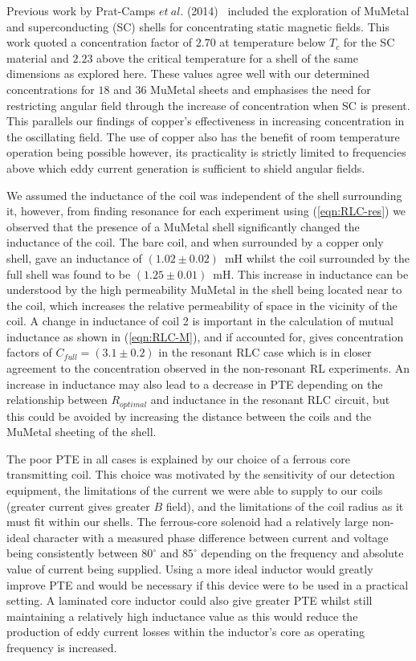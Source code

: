 \documentclass[11pt]{iopart}
\begin{document}
Previous work by Prat-Camps $et~al.$ (2014)~\cite{N2014} included the exploration of
MuMetal and superconducting (SC) shells for concentrating static
magnetic fields. This work quoted a concentration factor of $2.70$ at
temperature below $T_c$ for the SC material and $2.23$ above the
critical temperature for a shell of the same dimensions as explored
here. These values agree well with our determined concentrations for $18$
and $36$ MuMetal sheets and emphasises the need for restricting angular
field through the increase of concentration when SC is present. This
parallels our findings of copper's effectiveness in increasing
concentration in the oscillating field. The use of copper also has the
benefit of room temperature operation being possible however, its
practicality is strictly limited to frequencies above which eddy
current generation is sufficient to shield angular fields. 

We assumed the inductance of the coil was independent of the shell
surrounding it, however, from finding resonance for each experiment
using (\ref{eqn:RLC-res}) we
observed that the presence of a MuMetal shell significantly changed
the inductance of the coil. The bare coil, and when surrounded by a
copper only shell, gave an inductance of $(1.02\pm0.02)$~mH whilst the
coil surrounded by the full shell was found to be $(1.25\pm0.01)$~mH.
This increase in inductance can be understood by the high permeability
MuMetal in the shell being located near to the coil, which increases
the relative permeability of space in the vicinity of the coil. A
change in inductance of coil 2 is important in the calculation of
mutual inductance as shown in (\ref{eqn:RLC-M}), and if
accounted for, gives concentration factors of $C_{full}=(3.1\pm0.2)$ in
the resonant RLC case which is in closer agreement to the concentration
observed in the non-resonant RL experiments. An increase in inductance may also
lead to a decrease in PTE depending on the relationship between
$R_{optimal}$ and inductance in the resonant RLC circuit, but this could be
avoided by increasing the distance between the coils and the MuMetal
sheeting of the shell.

The poor PTE in all cases is explained by our choice of a ferrous
core transmitting coil. This choice was motivated by the sensitivity of our
detection equipment, the limitations of the current we were able to
supply to our coils (greater current gives greater $B$ field), and the
limitations of the coil radius as it must fit within our shells. The
ferrous-core solenoid had a relatively large non-ideal character with
a measured phase difference between current and voltage being
consistently between $80^\circ$ and $85^\circ$ depending on the
frequency and absolute value of current being supplied. Using a more
ideal inductor would greatly improve PTE and would be necessary if
this device were to be used in a practical setting. A laminated core
inductor could also give greater PTE whilst still maintaining a
relatively high inductance value as this would reduce the production
of eddy current losses within the inductor's core as operating
frequency is increased. 
\end{document}
